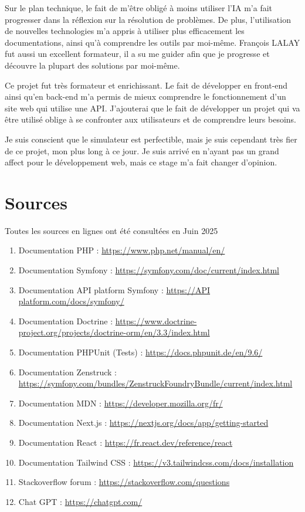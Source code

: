 \documentclass[a4paper,12pt]{report}
\begin{document}
\vspace{1em}

Sur le plan technique, le fait de m'être obligé à moins utiliser l'IA m'a fait progresser dans la réflexion sur la résolution de problèmes. De plus, l'utilisation de nouvelles technologies m'a appris à utiliser plus efficacement les documentations, ainsi qu'à comprendre les outils par moi-même. François LALAY fut aussi un excellent formateur, il a su me guider afin que je progresse et découvre la plupart des solutions par moi-même.

\vspace{1em}

Ce projet fut très formateur et enrichissant. Le fait de développer en front-end ainsi qu'en back-end m'a permis de mieux comprendre le fonctionnement d'un site web qui utilise une API. J'ajouterai que le fait de développer un projet qui va être utilisé oblige à se confronter aux utilisateurs et de comprendre leurs besoins.

\vspace{1em}

Je suis conscient que le simulateur est perfectible, mais je suis cependant très fier de ce projet, mon plus long à ce jour. Je suis arrivé en n'ayant pas un grand affect pour le développement web, mais ce stage m'a fait changer d'opinion.

\chapter{Sources}
Toutes les sources en lignes ont été consultées en Juin 2025

\begin{enumerate}
    \item Documentation PHP : \url{https://www.php.net/manual/en/}
    \item Documentation Symfony : \url{https://symfony.com/doc/current/index.html}
    \item Documentation API platform Symfony : \url{https://API platform.com/docs/symfony/}
    \item Documentation Doctrine : \url{https://www.doctrine-project.org/projects/doctrine-orm/en/3.3/index.html}
    \item Documentation PHPUnit (Tests) : \url{https://docs.phpunit.de/en/9.6/}
    \item Documentation Zenstruck : \url{https://symfony.com/bundles/ZenstruckFoundryBundle/current/index.html}
    \item Documentation MDN : \url{https://developer.mozilla.org/fr/}
    \item Documentation Next.js : \url{https://nextjs.org/docs/app/getting-started}
    \item Documentation React : \url{https://fr.react.dev/reference/react}
    \item Documentation Tailwind CSS : \url{https://v3.tailwindcss.com/docs/installation}
    \item Stackoverflow forum : \url{https://stackoverflow.com/questions}
    \item Chat GPT : \url{https://chatgpt.com/}
\end{enumerate}
\end{document}
